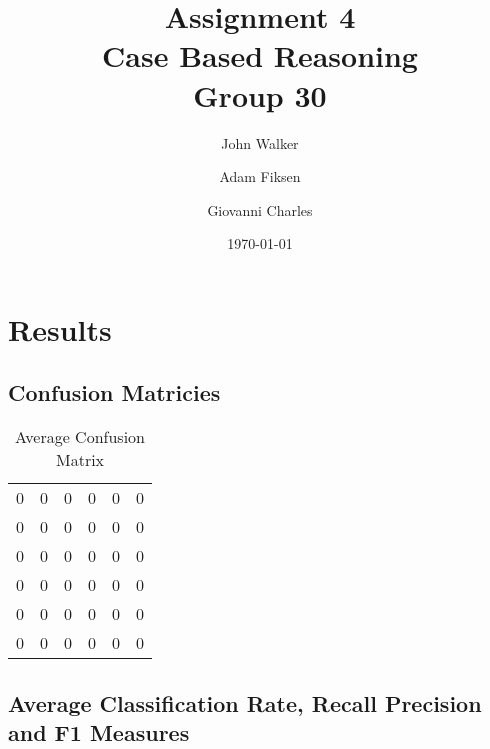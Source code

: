 \documentclass[11pt]{article}
\begin{document}
\title{Assignment 4\\ Case Based Reasoning \\ Group 30  }

\author{John Walker \and Adam Fiksen \and Giovanni Charles }

\date{\today}         %

\maketitle           %


\section{Results}

\subsection{Confusion Matricies}

\begin{table}[H]
\caption{Average Confusion Matrix} %
\centering %
\begin{tabular}{c c c c c c} %
\hline %
0  & 0   & 0   & 0   & 0  & 0   \\ %
0  & 0   & 0   & 0   & 0  & 0   \\
0  & 0   & 0   & 0   & 0  & 0   \\
0  & 0   & 0   & 0   & 0  & 0   \\
0  & 0   & 0   & 0   & 0  & 0   \\ 
0  & 0   & 0   & 0   & 0  & 0 \\ [1ex] %
\hline %
\end{tabular}
\label{table:conf} %
\end{table}


\subsection{Average Classification Rate, Recall Precision and F1 Measures}
\end{document}
